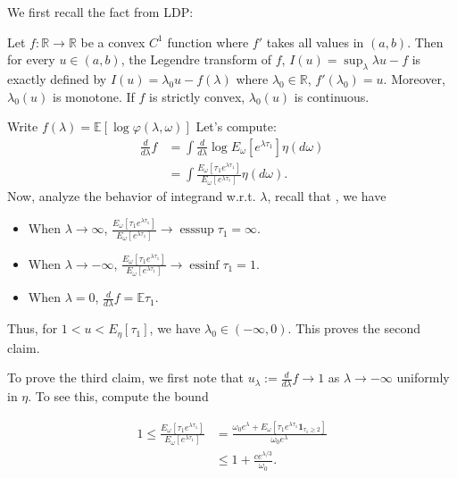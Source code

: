 We first recall the fact from LDP:

\begin{tcolorbox}[title=,colback=gray!10,colframe=black,breakable]
	Let $f: \mathbb{R} \to  \mathbb{R}$ be a convex $C^1$ function where $f'$ takes all values in $(a,b)$. Then for every $u \in (a,b)$, the Legendre transform of $f$, $I(u) = \sup _\lambda \lambda u - f$ is exactly defined by $I(u) = \lambda_0 u - f(\lambda)$ where $\lambda_0 \in \mathbb{R}$, $f'(\lambda_0) = u$. Moreover, $\lambda_0 (u)$ is monotone. If $f$ is strictly convex, $\lambda_0(u)$ is continuous.
\end{tcolorbox}

Write $f(\lambda) = \mathbb{E}\left[ \log \varphi(\lambda, \omega) \right] $
Let's compute:
\begin{align*}
	\frac{d }{d \lambda} f 
	&= \int \frac{d }{d \lambda} \log E_\omega \left[ e^{\lambda \tau_1} \right] \eta(d \omega) \\
	&= \int \frac{E_\omega \left[ \tau_1 e^{\lambda \tau_1} \right]}{E_\omega \left[ e^{\lambda \tau_1} \right]}  \eta(d \omega)
.\end{align*}
Now, analyze the behavior of integrand w.r.t. $\lambda$, recall that , we have
\begin{itemize}
	\item When $\lambda \to \infty $, $\frac{E_\omega \left[ \tau_1 e^{\lambda \tau_1} \right]}{E_\omega \left[ e^{\lambda \tau_1} \right]} \to \operatorname{esssup } \tau_1 = \infty $.
	\item When $\lambda \to -\infty $, $\frac{E_\omega \left[ \tau_1 e^{\lambda \tau_1} \right]}{E_\omega \left[ e^{\lambda \tau_1} \right]} \to \operatorname{essinf } \tau_1 = 1 $.
	\item When $\lambda = 0$, $\frac{d }{d \lambda} f = \mathbb{E}\tau_1$.
\end{itemize}

Thus, for $1<u<E_\eta\left[\tau_1\right]$, we have  $\lambda_0 \in (- \infty , 0)$. This proves the second claim.

To prove the third claim, we first note that $u_\lambda := \frac{d }{d \lambda} f \to 1$ as $\lambda \to -\infty $ uniformly in $\eta$. To see this, compute the bound


\begin{align*}
	1 \le \frac{E_\omega \left[ \tau_1 e^{\lambda \tau_1} \right] }{E_\omega \left[ e^{\lambda \tau_1} \right] } 
	&= \frac{\omega_0 e^\lambda + E_\omega \left[ \tau_1 e^{\lambda \tau_1} \mathbf{1}_{\tau_1 \ge 2} \right] }{\omega_0 e^\lambda} \\
	&\leq 1 + \frac{c e^{\lambda / 3}}{ \omega_0}
.\end{align*}

